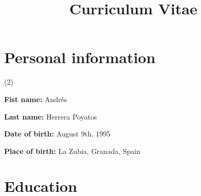 \documentclass[10pt,a4paper,sans]{moderncv} %
\title{Curriculum Vitae}
\begin{document}
\makecvtitle %


\vspace*{-19mm}
\section{Personal information}

\begin{itemlist}[label=~](2)
\item \textbf{Fist name:} Andrés
\item* \textbf{Last name:} Herrera Poyatos
\item	\textbf{Date of birth:} August 9th, 1995
\item *\textbf{Place of birth:} La Zubia, Granada, Spain
\end{itemlist}
\vspace*{-4mm}


\section{Education}
\end{document}
